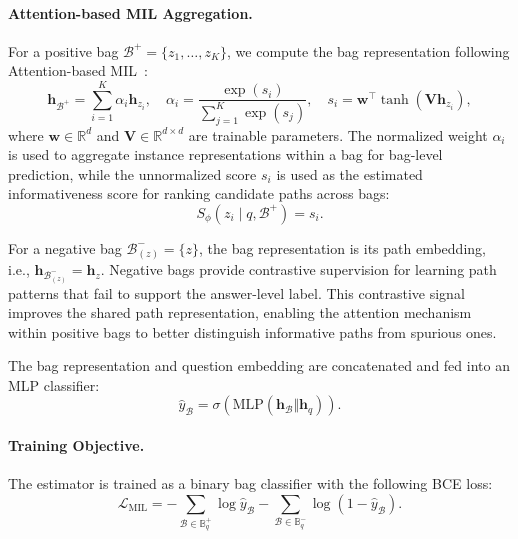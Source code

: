 \documentclass{article}
\begin{document}
\paragraph{Attention-based MIL Aggregation.}
For a positive bag $\mathcal{B}^+=\{z_1,\ldots,z_K\}$, we compute the bag representation following Attention-based MIL~\citep{ilse_attnmil_2018}:
\begin{equation}
\mathbf{h}_{\mathcal{B}^+}
=
\sum_{i=1}^{K}\alpha_i \mathbf{h}_{z_i},
\quad
\alpha_i
=
\frac{\exp(s_i)}
{\sum_{j=1}^{K}\exp(s_j)},
\quad
s_i
=
\mathbf{w}^{\top}\tanh(\mathbf{V}\mathbf{h}_{z_i}),
\end{equation}
where $\mathbf{w}\in\mathbb{R}^{d}$ and $\mathbf{V}\in\mathbb{R}^{d\times d}$ are trainable parameters.
The normalized weight $\alpha_i$ is used to aggregate instance representations within a bag for bag-level prediction, while the unnormalized score $s_i$ is used as the estimated informativeness score for ranking candidate paths across bags: 
\begin{equation}
S_\phi(z_i \mid q,\mathcal{B}^+) = s_i.
\end{equation}

For a negative bag $\mathcal{B}_{(z)}^-=\{z\}$, the bag representation is its path embedding, i.e., $\mathbf{h}_{\mathcal{B}_{(z)}^-}=\mathbf{h}_z$.
Negative bags provide contrastive supervision for learning path patterns that fail to support the answer-level label.
This contrastive signal improves the shared path representation, enabling the attention mechanism within positive bags to better distinguish informative paths from spurious ones.


The bag representation and question embedding are concatenated and fed into an MLP classifier:
\begin{equation}
\hat{y}_{\mathcal{B}}
=
\sigma
\left(
\mathrm{MLP}(\mathbf{h}_{\mathcal{B}}\Vert \mathbf{h}_q)
\right).
\end{equation}

\paragraph{Training Objective.}
The estimator is trained as a binary bag classifier with the following BCE loss:
\begin{equation}
\mathcal{L}_{\mathrm{MIL}}
=
-
\sum_{\mathcal{B}\in\mathbb{B}_q^+}
\log \hat{y}_{\mathcal{B}}
-
\sum_{\mathcal{B}\in\mathbb{B}_q^-}
\log(1-\hat{y}_{\mathcal{B}}).
\end{equation}
\end{document}
